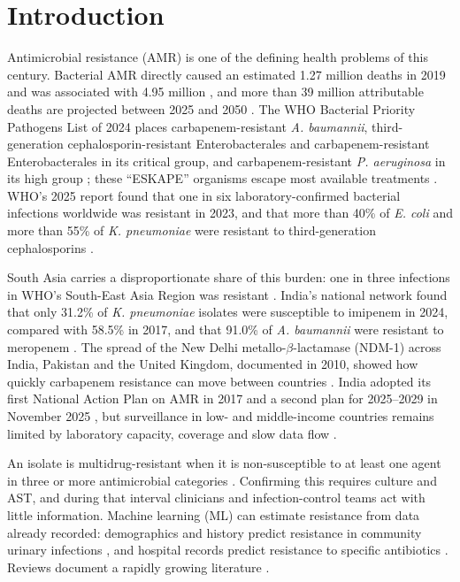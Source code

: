 \documentclass[conference]{IEEEtran}
\newcommand{\sci}[1]{\textit{#1}}
\begin{document}
\section{Introduction}\label{sec:intro}
Antimicrobial resistance (AMR) is one of the defining health problems of this century. Bacterial AMR directly caused an estimated 1.27 million deaths in 2019 and was associated with 4.95 million \cite{murray2022}, and more than 39 million attributable deaths are projected between 2025 and 2050 \cite{naghavi2024}. The WHO Bacterial Priority Pathogens List of 2024 places carbapenem-resistant \sci{A. baumannii}, third-generation cephalosporin-resistant Enterobacterales and carbapenem-resistant Enterobacterales in its critical group, and carbapenem-resistant \sci{P. aeruginosa} in its high group \cite{who_bppl2024}; these ``ESKAPE'' organisms escape most available treatments \cite{rice2008}. WHO's 2025 report found that one in six laboratory-confirmed bacterial infections worldwide was resistant in 2023, and that more than 40\% of \sci{E. coli} and more than 55\% of \sci{K. pneumoniae} were resistant to third-generation cephalosporins \cite{who_glass2025}.

South Asia carries a disproportionate share of this burden: one in three infections in WHO's South-East Asia Region was resistant \cite{who_glass2025}. India's national network found that only 31.2\% of \sci{K. pneumoniae} isolates were susceptible to imipenem in 2024, compared with 58.5\% in 2017, and that 91.0\% of \sci{A. baumannii} were resistant to meropenem \cite{icmr2024}. The spread of the New Delhi metallo-$\beta$-lactamase (NDM-1) across India, Pakistan and the United Kingdom, documented in 2010, showed how quickly carbapenem resistance can move between countries \cite{kumarasamy2010}. India adopted its first National Action Plan on AMR in 2017 \cite{napamr2017} and a second plan for 2025--2029 in November 2025 \cite{napamr2025}, but surveillance in low- and middle-income countries remains limited by laboratory capacity, coverage and slow data flow \cite{gandra2020}.

An isolate is multidrug-resistant when it is non-susceptible to at least one agent in three or more antimicrobial categories \cite{magiorakos2012}. Confirming this requires culture and AST, and during that interval clinicians and infection-control teams act with little information. Machine learning (ML) can estimate resistance from data already recorded: demographics and history predict resistance in community urinary infections \cite{yelin2019}, and hospital records predict resistance to specific antibiotics \cite{lewinepstein2021}. Reviews document a rapidly growing literature \cite{kim2022,ardila2025,latif2026}.
\end{document}
